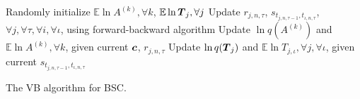 \begin{algorithm}
\DontPrintSemicolon
 \nl Randomly initialize $\mathbb{E}\ln A^{(k)},\forall k$,
 $\mathbb{E}\ln \boldsymbol T_j,\forall j$ 
 {
 \nl Update $r_{j,n,\tau}$, $s_{t_{j,n,\tau\!-\!1}, t_{\iota,n,\tau}}$, $\forall j,\forall \tau,\forall i,\forall \iota$,
 using forward-backward algorithm\;%
 \nl Update $\ln q(A^{(k)})$ and $\mathbb{E}\ln A^{(k)},\forall k$, 
 given current $\boldsymbol c$, $r_{j,n,\tau}$\;
 \nl Update $\ln q(\boldsymbol T_j)$ and $\mathbb{E}\ln T_{j,\iota},\forall j,\forall \iota$, 
 given current $s_{t_{j,n,\tau\!-\!1}, t_{\iota,n,\tau}}$\;
 }
\;
\caption{The VB algorithm for BSC.}
\label{al:vb_bac}
\end{algorithm}

